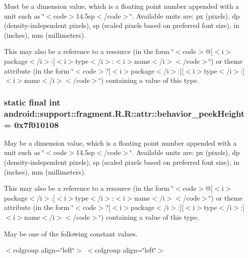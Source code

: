 Must be a dimension value, which is a floating point number appended with a unit such as \char`\"{}$<$code$>$14.5sp$<$/code$>$\char`\"{}. Available units are: px (pixels), dp (density-independent pixels), sp (scaled pixels based on preferred font size), in (inches), mm (millimeters). 

This may also be a reference to a resource (in the form \char`\"{}$<$code$>$@\mbox{[}$<$i$>$package$<$/i$>$:\mbox{]}$<$i$>$type$<$/i$>$:$<$i$>$name$<$/i$>$$<$/code$>$\char`\"{}) or theme attribute (in the form \char`\"{}$<$code$>$?\mbox{[}$<$i$>$package$<$/i$>$:\mbox{]}\mbox{[}$<$i$>$type$<$/i$>$:\mbox{]}$<$i$>$name$<$/i$>$$<$/code$>$\char`\"{}) containing a value of this type. \hypertarget{classandroid_1_1support_1_1fragment_1_1_r_1_1attr_78a6f3c5f2e62b688f41376a61cf5a6c}{
\subsubsection[{behavior\_\-peekHeight}]{\setlength{\rightskip}{0pt plus 5cm}static final int android::support::fragment.R.R::attr::behavior\_\-peekHeight = 0x7f010108}}
\label{classandroid_1_1support_1_1fragment_1_1_r_1_1attr_78a6f3c5f2e62b688f41376a61cf5a6c}


May be a dimension value, which is a floating point number appended with a unit such as \char`\"{}$<$code$>$14.5sp$<$/code$>$\char`\"{}. Available units are: px (pixels), dp (density-independent pixels), sp (scaled pixels based on preferred font size), in (inches), mm (millimeters). 

This may also be a reference to a resource (in the form \char`\"{}$<$code$>$@\mbox{[}$<$i$>$package$<$/i$>$:\mbox{]}$<$i$>$type$<$/i$>$:$<$i$>$name$<$/i$>$$<$/code$>$\char`\"{}) or theme attribute (in the form \char`\"{}$<$code$>$?\mbox{[}$<$i$>$package$<$/i$>$:\mbox{]}\mbox{[}$<$i$>$type$<$/i$>$:\mbox{]}$<$i$>$name$<$/i$>$$<$/code$>$\char`\"{}) containing a value of this type. 

May be one of the following constant values. \begin{TabularC}{0}
\hline
\end{TabularC}
$<$colgroup align=\char`\"{}left\char`\"{}$>$ $<$colgroup align=\char`\"{}left\char`\"{}$>$ 

